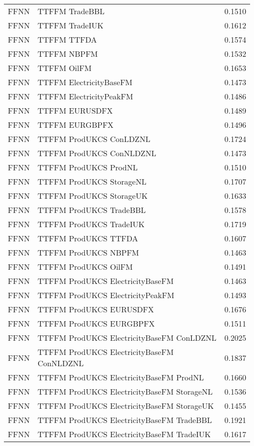 \begin{table}[h!]
\begin{adjustbox}{max width=\textwidth}
\begin{tabular}{llr}
  FFNN & TTFFM TradeBBL & 0.1510 \\ 
  FFNN & TTFFM TradeIUK & 0.1612 \\ 
  FFNN & TTFFM TTFDA & 0.1574 \\ 
  FFNN & TTFFM NBPFM & 0.1532 \\ 
  FFNN & TTFFM OilFM & 0.1653 \\ 
  FFNN & TTFFM ElectricityBaseFM & 0.1473 \\ 
  FFNN & TTFFM ElectricityPeakFM & 0.1486 \\ 
  FFNN & TTFFM EURUSDFX & 0.1489 \\ 
  FFNN & TTFFM EURGBPFX & 0.1496 \\ 
  FFNN & TTFFM ProdUKCS ConLDZNL & 0.1724 \\ 
  FFNN & TTFFM ProdUKCS ConNLDZNL & 0.1473 \\ 
  FFNN & TTFFM ProdUKCS ProdNL & 0.1510 \\ 
  FFNN & TTFFM ProdUKCS StorageNL & 0.1707 \\ 
  FFNN & TTFFM ProdUKCS StorageUK & 0.1633 \\ 
  FFNN & TTFFM ProdUKCS TradeBBL & 0.1578 \\ 
  FFNN & TTFFM ProdUKCS TradeIUK & 0.1719 \\ 
  FFNN & TTFFM ProdUKCS TTFDA & 0.1607 \\ 
  FFNN & TTFFM ProdUKCS NBPFM & 0.1463 \\ 
  FFNN & TTFFM ProdUKCS OilFM & 0.1491 \\ 
  FFNN & TTFFM ProdUKCS ElectricityBaseFM & 0.1463 \\ 
  FFNN & TTFFM ProdUKCS ElectricityPeakFM & 0.1493 \\ 
  FFNN & TTFFM ProdUKCS EURUSDFX & 0.1676 \\ 
  FFNN & TTFFM ProdUKCS EURGBPFX & 0.1511 \\ 
  FFNN & TTFFM ProdUKCS ElectricityBaseFM ConLDZNL & 0.2025 \\ 
  FFNN & TTFFM ProdUKCS ElectricityBaseFM ConNLDZNL & 0.1837 \\ 
  FFNN & TTFFM ProdUKCS ElectricityBaseFM ProdNL & 0.1660 \\ 
  FFNN & TTFFM ProdUKCS ElectricityBaseFM StorageNL & 0.1536 \\ 
  FFNN & TTFFM ProdUKCS ElectricityBaseFM StorageUK & 0.1455 \\ 
  FFNN & TTFFM ProdUKCS ElectricityBaseFM TradeBBL & 0.1921 \\ 
  FFNN & TTFFM ProdUKCS ElectricityBaseFM TradeIUK & 0.1617 \\ 

\end{tabular}
\end{adjustbox}
\end{table}
